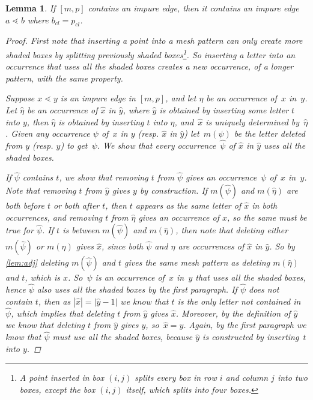 \documentclass[preprint,11pt]{elsarticle}
\newtheorem{lem}[thm]{Lemma}\crefname{lem}{Lemma}{Lemmas}
\newcommand\cl[1]{#1_{cl}}
\numberwithin{equation}{section}
\numberwithin{figure}{section}
\numberwithin{thm}{section}
\begin{document}
\begin{lem}\label{lem:topImpure}
If $[m,p]$ contains an impure edge, then it contains an impure edge
$a\lessdot b$ where $\cl{b}=\cl{p}$.
\begin{proof}
First note that inserting a point into a mesh pattern can only create more shaded boxes by splitting previously 
 shaded boxes\footnote{A point inserted in box $(i,j)$ splits
 every box in row $i$ and column $j$ into two boxes, except the box $(i,j)$ itself,
 which splits into four boxes.}. So inserting a letter into
 an occurrence that uses all the shaded boxes
 creates a new occurrence, of a longer pattern, with the same property.

Suppose $x\lessdot y$ is an impure edge in $[m,p]$, and let $\eta$ be an occurrence of~$x$ in~$y$.
 Let $\hat{\eta}$ be an occurrence of $\hat{x}$ in $\hat{y}$,
 where $\hat{y}$ is obtained by inserting some letter $t$ into $y$, then $\hat{\eta}$ is obtained by inserting 
 $t$ into $\eta$, and~$\hat{x}$ is uniquely determined by~$\hat{\eta}$.
 Given any occurrence $\psi$ of~$x$ in $y$ (resp. $\hat{x}$ in $\hat{y}$) let~$m(\psi)$ be the letter deleted from $y$ (resp. $\hat{y}$) to get~$\psi$.
 We show that every occurrence~$\hat{\psi}$ of $\hat{x}$ in $\hat{y}$ uses all the shaded boxes.

If $\hat{\psi}$ contains $t$, we show that removing $t$ 
 from $\hat{\psi}$ gives an occurrence~$\psi$ of~$x$ in~$y$. Note that removing $t$ from $\hat{y}$ gives $y$ by construction. 
 If $m(\hat{\psi})$ and $m(\hat{\eta})$ are both before $t$ or both after $t$, then $t$ appears as the same letter of $\hat{x}$ in both occurrences,
 and removing $t$ from $\hat{\eta}$ gives
 an occurrence of $x$, so the same must be true for $\hat{\psi}$. If $t$ is between $m(\hat{\psi})$ and $m(\hat{\eta})$, 
 then note that deleting either $m(\hat{\psi})$ or $m(\hat{\eta})$ gives $\hat{x}$, since both $\hat{\psi}$ and
 $\hat{\eta}$ are occurrences of $\hat{x}$ in $\hat{y}$. So by \cref{lem:adj}
 deleting $m(\hat{\psi})$ and $t$ gives the same mesh pattern as deleting $m(\hat{\eta})$ and $t$, which is $x$.
 So~$\psi$ is an occurrence of~$x$ in~$y$ that uses all the shaded boxes, hence $\hat{\psi}$ also uses
 all the shaded boxes by the first paragraph.
 If $\hat{\psi}$ does not contain $t$, then as $|\hat{x}|=|\hat{y}-1|$ we know that $t$ is the only letter not contained in $\hat{\psi}$,
 which implies that deleting $t$ from $\hat{y}$ gives	
 $\hat{x}$. Moreover, by the definition of $\hat{y}$ we know that deleting $t$ from $\hat{y}$ gives $y$, so~$\hat{x}=y$. Again, by the first paragraph
 we know that $\hat{\psi}$ must use all the shaded boxes, because $\hat{y}$ is constructed by inserting~$t$ into $y$.


\end{proof}
\end{lem}
\end{document}
